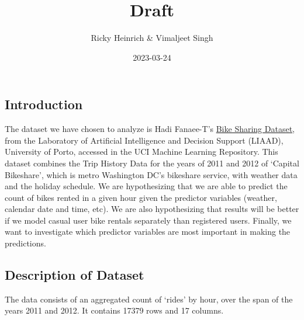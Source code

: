 \documentclass[
]{article}
\title{Draft}
\author{Ricky Heinrich \& Vimaljeet Singh}
\date{2023-03-24}
\begin{document}
\maketitle

\hypertarget{introduction}{%
\subsection{Introduction}\label{introduction}}

The dataset we have chosen to analyze is Hadi Fanaee-T's
\href{https://archive.ics.uci.edu/ml/datasets/Bike+Sharing+Dataset}{Bike
Sharing Dataset}, from the Laboratory of Artificial Intelligence and
Decision Support (LIAAD), University of Porto, accessed in the UCI
Machine Learning Repository. This dataset combines the Trip History Data
for the years of 2011 and 2012 of `Capital Bikeshare', which is metro
Washington DC's bikeshare service, with weather data and the holiday
schedule. We are hypothesizing that we are able to predict the count of
bikes rented in a given hour given the predictor variables (weather,
calendar date and time, etc). We are also hypothesizing that results
will be better if we model casual user bike rentals separately than
registered users. Finally, we want to investigate which predictor
variables are most important in making the predictions.

\hypertarget{description-of-dataset}{%
\subsection{Description of Dataset}\label{description-of-dataset}}

The data consists of an aggregated count of `rides' by hour, over the
span of the years 2011 and 2012. It contains 17379 rows and 17 columns.
\end{document}
